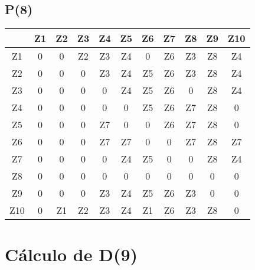 \documentclass[a4paper,11pt]{article}
\begin{document}
\subsection*{P(8)}
\begin{center}
\begin{tabular}{c|cccccccccc}
 & Z1 & Z2 & Z3 & Z4 & Z5 & Z6 & Z7 & Z8 & Z9 & Z10 \\ \hline
Z1 & 0 & 0 & Z2 & Z3 & Z4 & 0 & Z6 & Z3 & Z8 & Z4 \\
Z2 & 0 & 0 & 0 & Z3 & Z4 & Z5 & Z6 & Z3 & Z8 & Z4 \\
Z3 & 0 & 0 & 0 & 0 & Z4 & Z5 & Z6 & 0 & Z8 & Z4 \\
Z4 & 0 & 0 & 0 & 0 & 0 & Z5 & Z6 & Z7 & Z8 & 0 \\
Z5 & 0 & 0 & 0 & Z7 & 0 & 0 & Z6 & Z7 & Z8 & 0 \\
Z6 & 0 & 0 & 0 & Z7 & Z7 & 0 & 0 & Z7 & Z8 & Z7 \\
Z7 & 0 & 0 & 0 & 0 & Z4 & Z5 & 0 & 0 & Z8 & Z4 \\
Z8 & 0 & 0 & 0 & 0 & 0 & 0 & 0 & 0 & 0 & 0 \\
Z9 & 0 & 0 & 0 & Z3 & Z4 & Z5 & Z6 & Z3 & 0 & 0 \\
Z10 & 0 & Z1 & Z2 & Z3 & Z4 & Z1 & Z6 & Z3 & Z8 & 0 \\
\end{tabular}
\end{center}
\newpage
\section*{Cálculo de D(9)}
\end{document}
